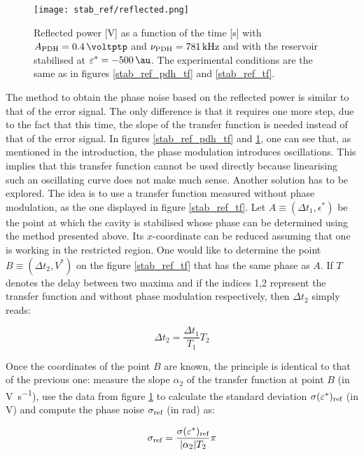 \begin{figure}
	\centering
	\texttt{[image: stab\_ref/reflected.png]}
	\caption{Reflected power [\si{\volt}] as a function of the time [\si{\second}] with $\tind{A}{PDH} = \SI{0.4}{\voltptp}$ and $\nu_{\text{PDH}} = \SI{781}{\kilo\hertz}$ and with the reservoir stabilised at $\epsilon^* = \SI{-500}{\au}$. The experimental conditions are the same as in figures \ref{stab_ref_pdh_tf} and \ref{stab_ref_tf}.}
	\label{stab_ref_reflected}
\end{figure}

The method to obtain the phase noise based on the reflected power is similar to that of the \pdh error signal. The only difference is that it requires one more step, due to the fact that this time, the slope of the transfer function is needed instead of that of the error signal. In figures \ref{stab_ref_pdh_tf} and \ref{stab_ref_reflected}, one can see that, as mentioned in the introduction, the \pdh phase modulation introduces oscillations. This implies that this transfer function cannot be used directly because linearising such an oscillating curve does not make much sense. Another solution has to be explored. The idea is to use a transfer function measured without \pdh phase modulation, as the one displayed in figure \ref{stab_ref_tf}. Let $A\equiv(\Delta t_1, \epsilon^*)$ be the point at which the cavity is stabilised whose phase can be determined using the method presented above. Its $x$-coordinate can be reduced assuming that one is working in the restricted region. One would like to determine the point $B\equiv(\Delta t_2, V^*)$ on the figure \ref{stab_ref_tf} that has the same phase as $A$. If $T$ denotes the delay between two maxima and if the indices 1,2 represent the transfer function and without phase modulation respectively, then $\Delta t_2$ simply reads:

\begin{equation}
	\Delta t_2 = \frac{\Delta t_1}{T_1} T_2
\end{equation}

Once the coordinates of the point $B$ are known, the principle is identical to that of the previous one: measure the slope $\alpha_2$ of the transfer function at point $B$ (in \si{\volt\per\second}), use the data from figure \ref{stab_ref_reflected} to calculate the standard deviation $\sigma(\varepsilon^*)_{\text{ref}}$ (in \si{\volt}) and compute the phase noise $\sigma_{\text{ref}}$ (in \si{\radian}) as:

\begin{equation}
	\sigma_{\text{ref}} = \frac{\sigma(\varepsilon^*)_{\text{ref}}}{|\alpha_2| T_2}\pi
\end{equation}

